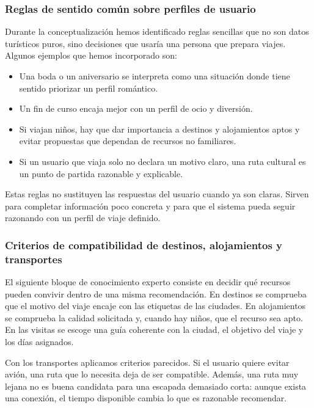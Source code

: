 \documentclass[11pt,a4paper]{article}
\begin{document}
\subsubsection{Reglas de sentido com\'un sobre perfiles de usuario}
Durante la conceptualizaci\'on hemos identificado reglas sencillas que no son
datos tur\'isticos puros, sino decisiones que usar\'ia una persona que prepara
viajes. Algunos ejemplos que hemos incorporado son:
\begin{itemize}
    \item Una boda o un aniversario se interpreta como una situaci\'on donde
    tiene sentido priorizar un perfil rom\'antico.
    \item Un fin de curso encaja mejor con un perfil de ocio y diversi\'on.
    \item Si viajan ni\~nos, hay que dar importancia a destinos y alojamientos
    aptos y evitar propuestas que dependan de recursos no familiares.
    \item Si un usuario que viaja solo no declara un motivo claro, una ruta
    cultural es un punto de partida razonable y explicable.
\end{itemize}

Estas reglas no sustituyen las respuestas del usuario cuando ya son claras.
Sirven para completar informaci\'on poco concreta y para que el sistema pueda
seguir razonando con un perfil de viaje definido.

\subsubsection{Criterios de compatibilidad de destinos, alojamientos y transportes}
El siguiente bloque de conocimiento experto consiste en decidir qu\'e recursos
pueden convivir dentro de una misma recomendaci\'on. En destinos se comprueba
que el motivo del viaje encaje con las etiquetas de las ciudades. En
alojamientos se comprueba la calidad solicitada y, cuando hay ni\~nos, que el
recurso sea apto. En las visitas se escoge una gu\'ia coherente con la ciudad,
el objetivo del viaje y los d\'ias asignados.

Con los transportes aplicamos criterios parecidos. Si el usuario quiere evitar
avi\'on, una ruta que lo necesita deja de ser compatible. Adem\'as, una ruta muy
lejana no es buena candidata para una escapada demasiado corta: aunque exista
una conexi\'on, el tiempo disponible cambia lo que es razonable recomendar.
\end{document}
